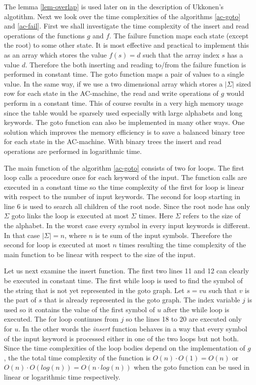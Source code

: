 \documentclass[english,twoside,censored,csm,algorithms-track-2020]{HYthesisML}
\theoremstyle{plain}
\theoremstyle{definition}
\begin{document}
The lemma \ref{lem-overlap} is used later on in the description of Ukkonen's algotithm. Next we look
over the time complexities of the algorithms \ref{ac-goto} and \ref{ac-fail}. First we shall investigate
the time complexity of the insert and read operations of the functions $g$ and $f$. The failure
function maps each state (except the root) to some other state. It is most effective and practical
to implement this as an array which stores the value $f(s)=d$ such that the array index $s$ has
a value $d$. Therefore the both inserting and reading to/from the failure function is performed
in constant time. The goto function maps a pair of values to a single value.
In the same way, if we use a two dimensional array which stores
a $|\Sigma|$ sized row for each state in the AC-machine, the read and write operations of $g$ would
perform in a constant time. This of course results in a very high memory usage since the table would be
sparsely used especially with large alphabets and long keywords. The goto function can also
be implemented in many other ways. One solution which improves the memory efficiency is to save
a balanced binary tree for each state in the AC-machine. With binary trees the insert and read
operations are performed in logarithmic time.

The main function of the algorithm \ref{ac-goto} consists of two for loops.
The first loop calls a procedure once for each keyword of the input. The function calls are
executed in a constant time so the time complexity of the first for loop is linear with respect
to the number of input keywords. The second for loop starting in line 6 is used to search all
children of the root node. Since the root node has only $\Sigma$ goto links the loop is executed at most
$\Sigma$ times. Here $\Sigma$ refers to the size of the alphabet. In the worst case every symbol in
every input keywords is different. In that case $|\Sigma| = n$, where $n$ is te sum of the input symbols.
Therefore the second for loop is executed at most $n$ times resulting the time complexity of the main
function to be linear with respect to the size of the input.

Let us next examine the insert function. The first two lines 11 and 12 can clearly be executed in constant
time. The first while loop is used to find the symbol of the string that is not yet represented
in the goto graph. Let $s=vu$ such that $v$ is the part of $s$ that is already represented in the
goto graph. The index variable $j$ is used so it contains the value of the first symbol of $u$ after
the while loop is executed. The for loop continues from $j$ so the lines 18 to 20 are executed
only for $u$. In the other words the \textit{insert} function behaves in a way that every symbol of
the input keyword is processed either in one of the two loops but not both. Since the time complexities
of the loop bodies depend on the implementation of $g$, the the total time complexity of the function
is $O(n)\cdot O(1) = O(n)$ or $O(n)\cdot O(log(n)) = O(n\cdot log(n))$ when the goto function
can be used in linear or logarithmic time respectively.
\end{document}
